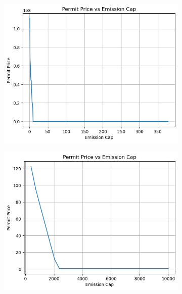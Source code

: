 \documentclass[a4paper,twoside,10pt]{article}
\begin{document}
\begin{figure}
	\centering
	
	\begin{subfigure}[b]{0.48\linewidth} %
		\centering
		\includegraphics[width=\linewidth]{images/Permit_price_vs_Emission_cap/0-350}
		\caption{}
		\label{fig:0-350}
	\end{subfigure}
	\hfill %
		\begin{subfigure}[b]{0.48\linewidth} %
		\centering
		\includegraphics[width=\linewidth]{images/Permit_price_vs_Emission_cap/480-10000}
		\caption{}
		\label{fig:480-10000}
	\end{subfigure}


\end{figure}
\end{document}
